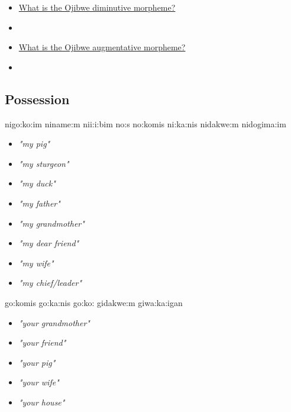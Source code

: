 \documentclass[a4paper,11pt]{article}
\begin{document}
\vspace{1cm}

\begin{itemize}
\item \underline{What is the Ojibwe diminutive morpheme?}
\item[] 
\item \underline{What is the Ojibwe augmentative morpheme?}
\item[] 
\end{itemize}



\pagebreak
\subsection{Possession}



\begin{multicols}{2}
\begin{exe}
\ex nigo:ko:im 
\ex niname:m 
\ex ni{\textyogh}i:i:bim 
\ex no:s 
\ex no:komis 
\ex ni:ka:nis 
\ex nidakwe:m 
\ex nidogima:im 
\end{exe}
\columnbreak
\begin{itemize}
\item[] \textit{"my pig"}
\item[] \textit{"my sturgeon"}
\item[] \textit{"my duck"}
\item[] \textit{"my father"}
\item[] \textit{"my grandmother"}
\item[] \textit{"my dear friend"}
\item[] \textit{"my wife"}
\item[] \textit{"my chief/leader"}
\end{itemize}
\end{multicols}


\begin{multicols}{2}
\begin{exe}
\ex go:komis 
\ex go:ka:nis
\ex go:ko: 
\ex gidakwe:m 
\ex giwa:ka:{\textglotstop}igan 
\end{exe}
\columnbreak
\begin{itemize}
\item[] \textit{"your grandmother"}
\item[] \textit{"your friend"}
\item[] \textit{"your pig"}
\item[] \textit{"your wife"}
\item[] \textit{"your house"}
\end{itemize}
\end{multicols}
\end{document}

